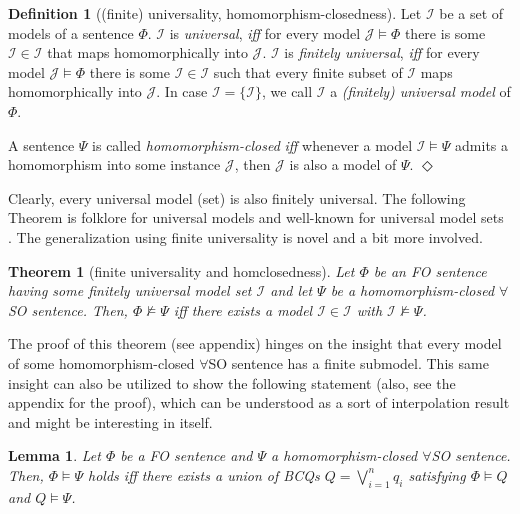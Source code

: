 \documentclass[10pt,a4paper]{amsart}
\theoremstyle{definition}
\numberwithin{equation}{section}
\theoremstyle{plain}
\newtheorem{theorem}[theorem]{Theorem}
\newtheorem{lemma}[lemma]{Lemma}
\theoremstyle{definition}
\newtheorem{definition}[definition]{Definition}
\theoremstyle{myexample}
\theoremstyle{plain}
\theoremstyle{definition}
\newcommand{\instance}{\mathcal{I}}
\newcommand{\iffi}{\textit{iff} } %
\newcommand{\defend}{\hfill\ensuremath{\Diamond}}
\begin{document}
\begin{definition}[(finite) universality, homomor\-phism-closedness]
Let $\mathscr{I}$ be a set of models of a sentence $\Phi$.
$\mathscr{I}$ is \emph{universal}, \iffi for every model $\mathcal{J} \models \Phi$ there is some $\instance \in \mathscr{I}$ that maps homomorphically into $\mathcal{J}$.
$\mathscr{I}$ is \emph{finitely universal}, \iffi for every model $\mathcal{J} \models \Phi$ there is some $\instance \in \mathscr{I}$ such that every finite subset of $\instance$ maps homomorphically into $\mathcal{J}$.  
%
In case $\mathscr{I} = \{\instance\}$, we call $\instance$ a \emph{(finitely) universal model} of $\Phi$.


A sentence $\Psi$ is called \emph{homomorphism-closed} \iffi whenever a model $\instance \models \Psi$ admits a homomorphism into some instance $\mathcal{J}$, then $\mathcal{J}$ is also a model of $\Psi$. \defend
\end{definition}
%
Clearly, every universal model (set) is also finitely universal.
The following Theorem is folklore for universal models and well-known for universal model sets \cite{BourhisMMP16}.
The generalization using finite universality is novel and a bit more involved.
%
\begin{theorem}[finite universality and homclosedness]\label{thm:universal}
Let $\Phi$ be an FO sentence having some finitely universal model set $\mathscr{I}$ and let $\Psi$ be a homomorphism-closed $\forall$SO sentence. Then, $\Phi \not \models \Psi$ \iffi there exists a model $\instance \in \mathscr{I}$ with $\instance \not\models \Psi$.
\end{theorem}
%
The proof of this theorem (see appendix) hinges on the insight that every model of some homomorphism-closed $\forall$SO sentence has a fi\-nite submodel.
This same insight can also be utilized to show the following statement (also, see the appendix for the proof), which can be understood as a sort of interpolation result and might be interesting in itself.
%
\begin{lemma}\label{lem:interpolation}
Let $\Phi$ be a FO sentence and $\Psi$ a homomorphism-closed $\forall$SO sentence.
Then, $\Phi \models \Psi$ holds \iffi there exists a union of BCQs $Q = \bigvee_{i=1}^n q_{i}$ satisfying $\Phi \models Q$ and $Q \models \Psi$.
\end{lemma}
\end{document}
